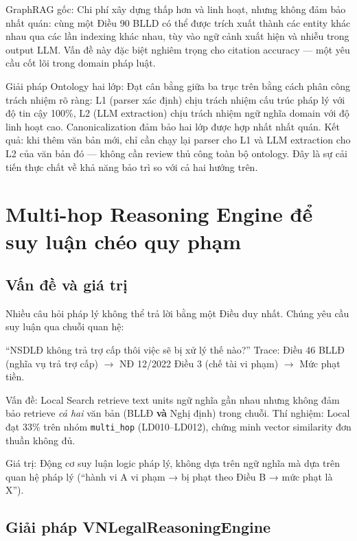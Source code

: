 \documentclass[../DoAn.tex]{subfiles}
\begin{document}
GraphRAG gốc: Chi phí xây dựng thấp hơn và linh hoạt, nhưng không đảm bảo nhất quán: cùng một Điều 90 \gls{BLLD} có thể được trích xuất thành các entity khác nhau qua các lần indexing khác nhau, tùy vào ngữ cảnh xuất hiện và nhiễu trong output LLM. Vấn đề này đặc biệt nghiêm trọng cho citation accuracy --- một yêu cầu cốt lõi trong domain pháp luật.

Giải pháp Ontology hai lớp: Đạt cân bằng giữa ba trục trên bằng cách phân công trách nhiệm rõ ràng: L1 (parser xác định) chịu trách nhiệm cấu trúc pháp lý với độ tin cậy 100\%, L2 (LLM extraction) chịu trách nhiệm ngữ nghĩa domain với độ linh hoạt cao. Canonicalization đảm bảo hai lớp được hợp nhất nhất quán. Kết quả: khi thêm văn bản mới, chỉ cần chạy lại parser cho L1 và LLM extraction cho L2 của văn bản đó --- không cần review thủ công toàn bộ ontology. Đây là sự cải tiến thực chất về khả năng bảo trì so với cả hai hướng trên.

\section{Multi-hop Reasoning Engine để suy luận chéo quy phạm}
\label{section:5.2}

\subsection{Vấn đề và giá trị}
\label{subsection:5.2.1}

Nhiều câu hỏi pháp lý không thể trả lời bằng một Điều duy nhất. Chúng yêu cầu suy luận qua chuỗi quan hệ:

\begin{example}
``NSDLĐ không trả trợ cấp thôi việc sẽ bị xử lý thế nào?''
Trace: Điều 46 BLLĐ (nghĩa vụ trả trợ cấp) $\rightarrow$ NĐ 12/2022 Điều 3 (chế tài vi phạm) $\rightarrow$ Mức phạt tiền.
\end{example}

Vấn đề: Local Search retrieve text units ngữ nghĩa gần nhau nhưng không đảm bảo retrieve \emph{cả hai} văn bản (BLLĐ \textbf{và} Nghị định) trong chuỗi. Thí nghiệm: Local đạt 33\% trên nhóm \texttt{multi\_hop} (LD010--LD012), chứng minh vector similarity đơn thuần không đủ.

Giá trị: Động cơ suy luận logic pháp lý, không dựa trên ngữ nghĩa mà dựa trên quan hệ pháp lý (``hành vi A vi phạm → bị phạt theo Điều B → mức phạt là X'').

\subsection{Giải pháp VNLegalReasoningEngine}
\label{subsection:5.2.2}
\end{document}

